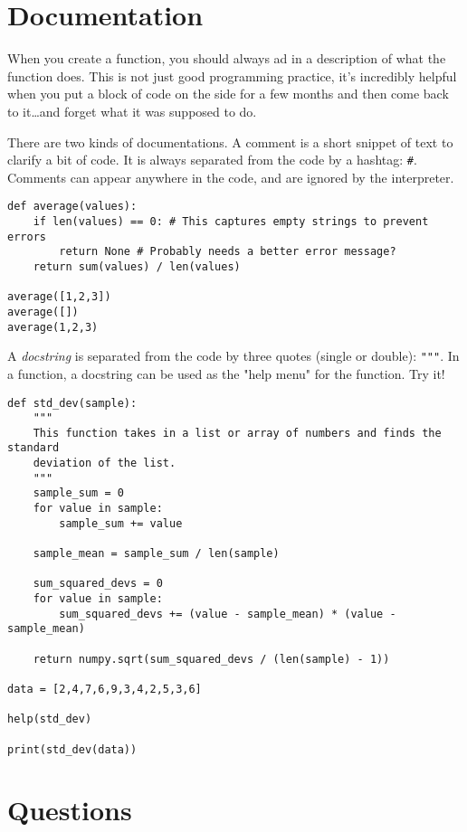 \documentclass[]{article}
\renewcommand{\_}{\char`_}
\begin{document}
\medskip\makebox[0.96\textwidth]{\hrulefill}

\medskip\makebox[0.96\textwidth]{\hrulefill}

\medskip\makebox[0.96\textwidth]{\hrulefill}


\section{Documentation}
When you create a function, you should always ad in a description of what the function does. This is not just good programming practice, it's incredibly helpful when you put a block of code on the side for a few months and then come back to it\dots and forget what it was supposed to do. 

There are two kinds of documentations. A comment is a short snippet of text to clarify a bit of code. It is always separated from the code by a hashtag: \texttt{\#}. Comments can appear anywhere in the code, and are ignored by the interpreter. 
\begin{lstlisting}
def average(values):
    if len(values) == 0: # This captures empty strings to prevent errors
        return None # Probably needs a better error message?
    return sum(values) / len(values)

average([1,2,3])
average([])
average(1,2,3)
\end{lstlisting}

A \textit{docstring} is separated from the code by three quotes (single or double): \texttt{"""}. In a function, a docstring can be used as the "help menu" for the function. Try it! 
\begin{lstlisting}
def std_dev(sample):
    """
    This function takes in a list or array of numbers and finds the standard 
    deviation of the list.
    """ 
    sample_sum = 0
    for value in sample:
        sample_sum += value

    sample_mean = sample_sum / len(sample)

    sum_squared_devs = 0
    for value in sample:
        sum_squared_devs += (value - sample_mean) * (value - sample_mean)

    return numpy.sqrt(sum_squared_devs / (len(sample) - 1))

data = [2,4,7,6,9,3,4,2,5,3,6]

help(std_dev)

print(std_dev(data))
\end{lstlisting}

\newpage

\section{Questions}
\end{document}
